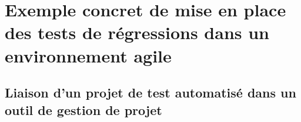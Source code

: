 \chapter[Exemple concret]{Exemple concret de mise en place des tests de régressions dans un environnement agile}
\thispagestyle{fancy}
\label{chap:exemples}
\section{Liaison d'un projet de test automatisé dans un outil de gestion de projet}